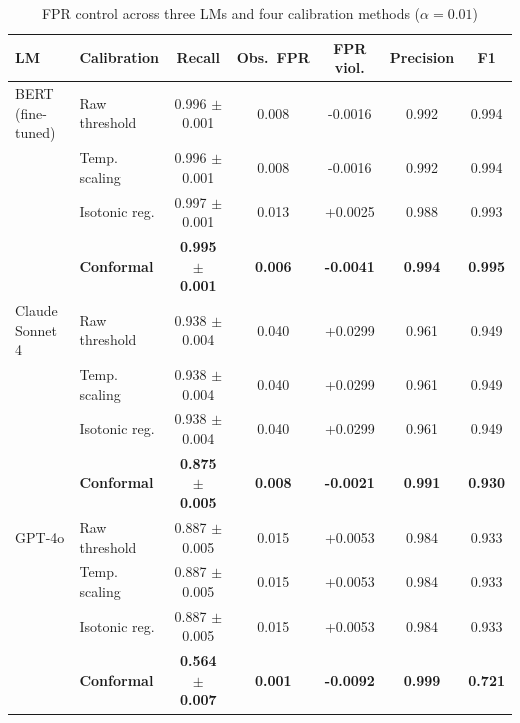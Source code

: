 \begin{table}[t]
\caption{FPR control across three LMs and four calibration methods ($\alpha = 0.01$)}
\label{tab:calibration_comparison}
\centering
\small
\begin{tabular}{llccccc}
\toprule
LM & Calibration & Recall & Obs.\ FPR & FPR viol. & Precision & F1 \\
\midrule
BERT (fine-tuned) & Raw threshold & 0.996 $\pm$ 0.001 & 0.008 & -0.0016 & 0.992 & 0.994 \\
 & Temp. scaling & 0.996 $\pm$ 0.001 & 0.008 & -0.0016 & 0.992 & 0.994 \\
 & Isotonic reg. & 0.997 $\pm$ 0.001 & 0.013 & +0.0025 & 0.988 & 0.993 \\
 & \textbf{Conformal} & \textbf{0.995 $\pm$ 0.001} & \textbf{0.006} & \textbf{-0.0041} & \textbf{0.994} & \textbf{0.995} \\
\midrule
Claude Sonnet 4 & Raw threshold & 0.938 $\pm$ 0.004 & 0.040 & +0.0299 & 0.961 & 0.949 \\
 & Temp. scaling & 0.938 $\pm$ 0.004 & 0.040 & +0.0299 & 0.961 & 0.949 \\
 & Isotonic reg. & 0.938 $\pm$ 0.004 & 0.040 & +0.0299 & 0.961 & 0.949 \\
 & \textbf{Conformal} & \textbf{0.875 $\pm$ 0.005} & \textbf{0.008} & \textbf{-0.0021} & \textbf{0.991} & \textbf{0.930} \\
\midrule
GPT-4o & Raw threshold & 0.887 $\pm$ 0.005 & 0.015 & +0.0053 & 0.984 & 0.933 \\
 & Temp. scaling & 0.887 $\pm$ 0.005 & 0.015 & +0.0053 & 0.984 & 0.933 \\
 & Isotonic reg. & 0.887 $\pm$ 0.005 & 0.015 & +0.0053 & 0.984 & 0.933 \\
 & \textbf{Conformal} & \textbf{0.564 $\pm$ 0.007} & \textbf{0.001} & \textbf{-0.0092} & \textbf{0.999} & \textbf{0.721} \\
\bottomrule
\end{tabular}
\end{table}